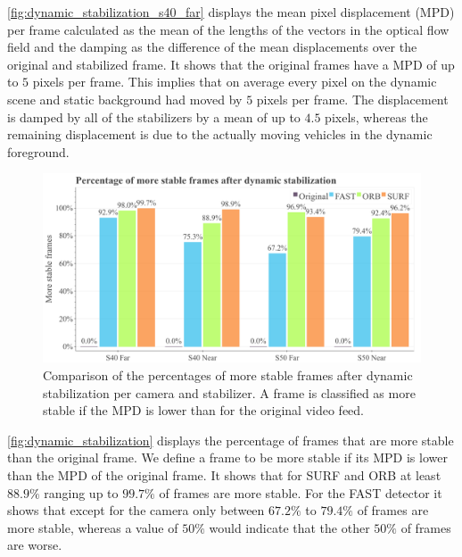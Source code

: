 \autoref{fig:dynamic_stabilization_s40_far} displays the mean pixel displacement (MPD) per frame calculated as the mean of the lengths of the vectors in the optical flow field and the damping as the difference of the mean displacements over the original and stabilized frame.
It shows that the original frames have a MPD of up to $5$ pixels per frame. This implies that on average every pixel on the dynamic scene and static background had moved by $5$ pixels per frame. 
The displacement is damped by all of the stabilizers by a mean of up to $4.5$ pixels, whereas the remaining displacement is due to the actually moving vehicles in the dynamic foreground.   

\begin{figure}[!ht]
      \includegraphics[width=\linewidth]{diagrams/optical_flow/stats.png}    
    \caption{
        Comparison of the percentages of more stable frames after dynamic stabilization per camera and stabilizer.
        A frame is classified as more stable if the MPD is lower than for the original video feed. 
    }
    \label{fig:dynamic_stabilization}
\end{figure}

\autoref{fig:dynamic_stabilization} displays the percentage of frames that are more stable than the original frame.
We define a frame to be more stable if its MPD is lower than the MPD of the original frame. 
It shows that for SURF and ORB at least $88.9\%$ ranging up to $99.7\%$ of frames are more stable.
For the FAST detector it shows that except for the  camera only between $67.2\%$ to $79.4\%$ of frames are more stable, whereas a value of $50\%$ would indicate that the other $50\%$ of frames are worse.  

